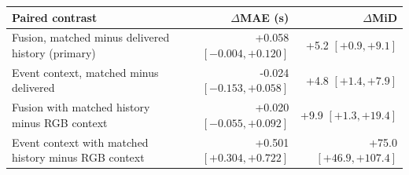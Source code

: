 \begin{tabular}{lrr}
\toprule
Paired contrast & $\Delta$MAE (s) & $\Delta$MiD \\
\midrule
Fusion, matched minus delivered history (primary) & +0.058 $[-0.004,+0.120]$ & +5.2 $[+0.9,+9.1]$ \\
Event context, matched minus delivered & -0.024 $[-0.153,+0.058]$ & +4.8 $[+1.4,+7.9]$ \\
Fusion with matched history minus RGB context & +0.020 $[-0.055,+0.092]$ & +9.9 $[+1.3,+19.4]$ \\
Event context with matched history minus RGB context & +0.501 $[+0.304,+0.722]$ & +75.0 $[+46.9,+107.4]$ \\
\bottomrule
\end{tabular}
